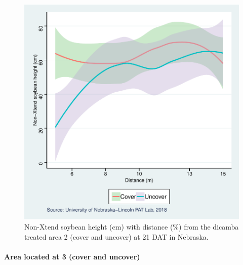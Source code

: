 \documentclass[]{article}
\let\oldparagraph\paragraph
\renewcommand{\paragraph}[1]{\oldparagraph{#1}\mbox{}}
\begin{document}
\begin{figure}
\centering
\includegraphics{Report_files/figure-latex/unnamed-chunk-82-1.pdf}
\caption{Non-Xtend soybean height (cm) with distance (\%) from the
dicamba treated area 2 (cover and uncover) at 21 DAT in Nebraska.}
\end{figure}

\newpage

\pagebreak

\paragraph{Area located at 3 (cover and
uncover)}\label{area-located-at-3-cover-and-uncover}
\end{document}
